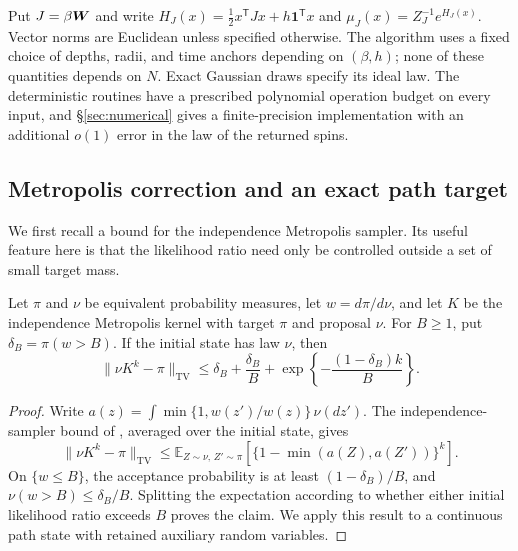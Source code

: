 \documentclass[11pt,reqno]{amsart}
\newcommand{\TV}{\operatorname{TV}}
\begin{document}
Put $J=\beta{\boldsymbol{W}}$ and write $H_J(x)=\frac12x^{\mathsf T}Jx+
h\mathbf1^{\mathsf T}x$ and $\mu_J(x)=Z_J^{-1}e^{H_J(x)}$.
Vector norms are Euclidean unless specified otherwise. The algorithm
uses a fixed choice of depths, radii, and time anchors depending on
$(\beta,h)$; none of these quantities depends on $N$. Exact Gaussian
draws specify its ideal law. The deterministic routines have a prescribed
polynomial operation budget on every input, and \S\ref{sec:numerical}
gives a finite-precision implementation with an additional $o(1)$ error
in the law of the returned spins.

\subsection{Metropolis correction and an exact path target}

We first recall a bound for the independence Metropolis sampler. Its useful
feature here is that the likelihood ratio need only be controlled outside
a set of small target mass.

\begin{lem}
\label{lem:imh}
Let $\pi$ and $\nu$ be equivalent probability measures, let
$w=d\pi/d\nu$, and let $K$ be the independence Metropolis kernel with
target $\pi$ and proposal $\nu$. For $B\ge1$, put
$\delta_B=\pi(w>B)$. If the initial state has law $\nu$, then
\begin{equation*}
 \|\nu K^k-\pi\|_{\TV}
 \le \delta_B+\frac{\delta_B}{B}
       +\exp\left\{-\frac{(1-\delta_B)k}{B}\right\}.
\end{equation*}
\end{lem}
\begin{proof}
Write $a(z)=\int\min\{1,w(z')/w(z)\}\,\nu(dz')$.
The independence-sampler bound of
\cite[Theorem~6]{roberts2011quantitative}, averaged over the initial
state, gives
\[
 \|\nu K^k-\pi\|_{\TV}
 \le \mathbb E_{Z\sim\nu,\,Z'\sim\pi}
       [\{1-\min(a(Z),a(Z'))\}^k].
\]
On $\{w\le B\}$, the acceptance probability is at least
$(1-\delta_B)/B$, and $\nu(w>B)\le\delta_B/B$.
Splitting the expectation according to whether either initial likelihood
ratio exceeds $B$ proves the claim. We apply this result to a continuous
path state with retained auxiliary random variables.
\end{proof}
\end{document}
